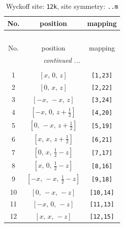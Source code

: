 \documentclass[fleqn,8pt]{jsarticle}
\begin{document}
\begin{longtable}{ccc}
\caption{Wyckoff site: {\tt 12k}, site symmetry: {\tt ..m}}
 \\
 \hline \hline
No. & position & mapping \\ \hline \endfirsthead

\multicolumn{2}{l}{\tablename\ \thetable{}} \\
 \hline \hline
No. & position & mapping \\ \hline \endhead

 \hline \hline
\multicolumn{2}{r}{\footnotesize\it continued ...} \\ \endfoot

 \hline \hline
\multicolumn{2}{r}{} \\ \endlastfoot

1 & $\left[ x,\, 0,\, z \right]$ & {\tt [1,23]} \\ \hline
2 & $\left[ 0,\, x,\, z \right]$ & {\tt [2,22]} \\ \hline
3 & $\left[ - x,\, - x,\, z \right]$ & {\tt [3,24]} \\ \hline
4 & $\left[ - x,\, 0,\, z + \frac{1}{2} \right]$ & {\tt [4,20]} \\ \hline
5 & $\left[ 0,\, - x,\, z + \frac{1}{2} \right]$ & {\tt [5,19]} \\ \hline
6 & $\left[ x,\, x,\, z + \frac{1}{2} \right]$ & {\tt [6,21]} \\ \hline
7 & $\left[ 0,\, x,\, \frac{1}{2} - z \right]$ & {\tt [7,17]} \\ \hline
8 & $\left[ x,\, 0,\, \frac{1}{2} - z \right]$ & {\tt [8,16]} \\ \hline
9 & $\left[ - x,\, - x,\, \frac{1}{2} - z \right]$ & {\tt [9,18]} \\ \hline
10 & $\left[ 0,\, - x,\, - z \right]$ & {\tt [10,14]} \\ \hline
11 & $\left[ - x,\, 0,\, - z \right]$ & {\tt [11,13]} \\ \hline
12 & $\left[ x,\, x,\, - z \right]$ & {\tt [12,15]} \\
\end{longtable}
\renewcommand{\arraystretch}{1.2}
\end{document}
